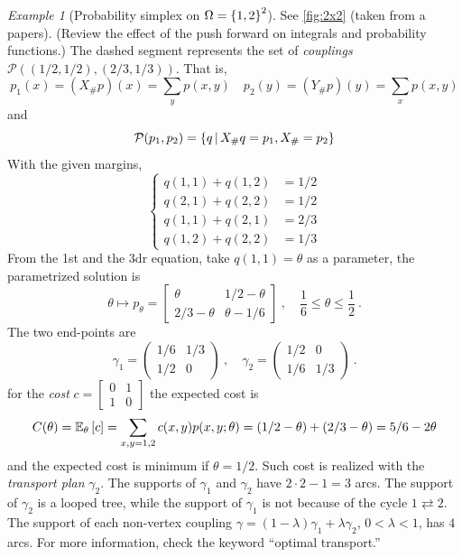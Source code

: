 \documentclass[12pt,a4paper]{amsart}
\theoremstyle{plain}%
\theoremstyle{definition}
\theoremstyle{remark}
\newtheorem{example}{Example}
\begin{document}
\begin{example}[Probability simplex on $\Omega = \left\{1,2\right\}^2$]
See \cref{fig:2x2} (taken from a papers). (Review the effect of the push forward on integrals and probability functions.) The dashed segment represents the set of \emph{couplings} $\mathcal P((1/2,1/2),(2/3,1/3))$. That is,
\begin{equation*}
  p_1(x) = (X_{\#} p)(x) = \sum_y p(x,y) \quad   p_2(y) = (Y_{\#} p)(y) = \sum_x p(x,y) 
\end{equation*}
and
\begin{equation*}
  \mathcal P(p_1,p_2) = \left\{q \, \middle| \, X_{\#} q = p_1,X_{\#} = p_2 \right\}
    \end{equation*}
    With the given margins,
    \begin{equation*}
      \begin{cases}
        q(1,1) + q(1,2) &= 1/2 \\
      q(2,1) + q(2,2) &= 1/2 \\
      q(1,1) + q(2,1) &= 2/3 \\
      q(1,2) + q(2,2) &= 1/3 
      \end{cases}
    \end{equation*}
From the 1st and the 3dr equation, take $q(1,1) = \theta$ as a parameter, the parametrized solution is
\begin{equation*}
  \theta \mapsto p_\theta =
  \begin{bmatrix}
    \theta & 1/2 - \theta \\ 2/3 - \theta & \theta - 1/6 
  \end{bmatrix} \ , 
  \quad \frac16 \leq \theta \leq \frac 12 \ .
\end{equation*}
The two end-points are
\begin{equation*}
\gamma_1 =
    \begin{pmatrix}
      1/6 & 1/3 \\ 1/2 & 0
    \end{pmatrix} \ , \quad \gamma_2 =
\begin{pmatrix}
  1/2 & 0 \\ 1/6 & 1/3
\end{pmatrix} \ .
\end{equation*}
for the \emph{cost} $c =
\begin{bmatrix}
  0 & 1 \\ 1 & 0
\end{bmatrix}$ the expected cost is
\begin{equation*}
 C(\theta) = \operatorname{\mathbb E}_{\theta}\left[c\right] = \sum_{x,y=1,2} c(x,y) p(x,y;\theta) = (1/2 - \theta) + (2/3 - \theta) = 5/6 - 2\theta
\end{equation*}
and the expected cost is minimum if $\theta = 1/2$. Such cost is
realized with the \emph{transport plan} $\gamma_2$.  The supports of
$\gamma_1$ and $\gamma_2$ have $2\cdot2-1 = 3$ arcs. The support of
$\gamma_2$ is a looped tree, while the support of $\gamma_1$ is not
because of the cycle $1 \rightleftarrows 2$.  The support of each
non-vertex coupling $\gamma = (1-\lambda)\gamma_1 + \lambda \gamma_2$,
$0 < \lambda < 1$, has $4$ arcs. For more information, check the keyword ``optimal transport.''
\end{example}
\end{document}
